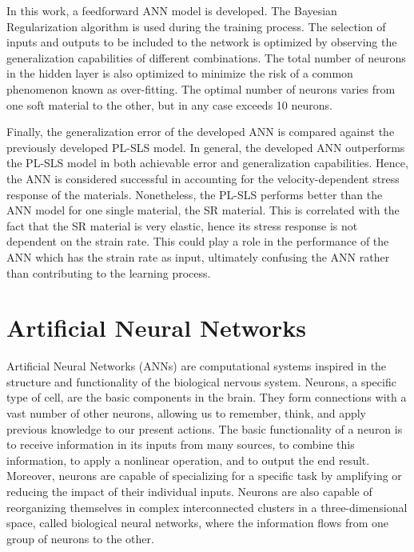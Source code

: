 In this work, a feedforward ANN model is developed. The Bayesian Regularization algorithm is used during the training process. The selection of inputs and outputs to be included to the network is optimized by observing the generalization capabilities of different combinations. The total number of neurons in the hidden layer is also optimized to minimize the risk of a common phenomenon known as over-fitting. The optimal number of neurons varies from one soft material to the other, but in any case exceeds 10 neurons.

Finally, the generalization error of the developed ANN is compared against the previously developed PL-SLS model. In general, the developed ANN outperforms the PL-SLS model in both achievable error and generalization capabilities. Hence, the ANN is considered successful in accounting for the velocity-dependent stress response of the materials. Nonetheless, the PL-SLS performs better than the ANN model for one single material, the SR material. This is correlated with the fact that the SR material is very elastic, hence its stress response is not dependent on the strain rate. This could play a role in the performance of the ANN which has the strain rate as input, ultimately confusing the ANN rather than contributing to the learning process.

\section{Artificial Neural Networks}

Artificial Neural Networks (ANNs) are computational systems inspired in the structure and functionality of the biological nervous system. Neurons, a specific type of cell, are the basic components in the brain. They form connections with a vast number of other neurons, allowing us to remember, think, and apply previous knowledge to our present actions. The basic functionality of a neuron is to receive information in its inputs from many sources, to combine this information, to apply a nonlinear operation, and to output the end result. Moreover, neurons are capable of specializing for a specific task by amplifying or reducing the impact of their individual inputs. Neurons are also capable of reorganizing themselves in complex interconnected clusters in a three-dimensional space, called biological neural networks, where the information flows from one group of neurons to the other.

